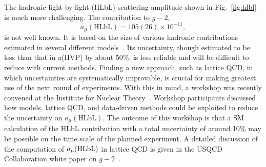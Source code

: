 The hadronic-light-by-light (HLbL) scattering amplitude shown in
Fig.~\ref{fig:hlbl} is much more challenging.  The contribution to
$g-2$,
\begin{equation}
    a_\mu(\textrm{HLbL}) = 105(26) \times 10^{-11},
    \label{eq:PRV}
\end{equation}
is not well known. It is based on the size of various hadronic contributions estimated in
several different models~\cite{arXiv:0901.0306}.
Its uncertainty, though estimated to be less than that in a(HVP) by about 50\%, is less reliable and will be difficult to reduce with current methods.
Finding a new approach, such as lattice QCD, in which uncertainties are systematically improvable,
is crucial for making greatest use of the next round of experiments.
With this in mind, a workshop was recently convened at the Institute for Nuclear Theory~\cite{INTws}.
Workshop participants discussed how models, lattice QCD, and data-driven methods could be exploited to reduce the
uncertainty on $a_\mu(\textrm{HLbL})$.
The outcome of this workshop is that 
a SM calculation of the HLbL contribution with a total uncertainty of around 10\% may be possible on the time scale of the planned experiment.
A detailed discussion of the computation of $a_\mu(\rm HLbL)$ in lattice QCD is given in the USQCD Collaboration white paper on $g-2$~\cite{USQCD}.
%
